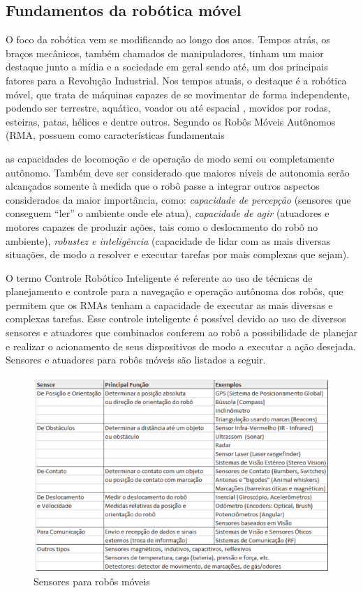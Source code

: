 \subsection{Fundamentos da robótica móvel}
O foco da robótica vem se modificando ao longo dos anos. Tempos atrás, os braços mecânicos, também chamados de manipuladores, tinham um maior destaque junto a mídia e a sociedade em geral \cite{wolf2009robotica} sendo até, um dos principais fatores para a Revolução Industrial. Nos tempos atuais, o destaque é a robótica móvel, que trata de máquinas capazes de se movimentar de forma independente, podendo ser terrestre, aquático, voador ou até espacial , movidos por rodas, esteiras, patas, hélices e dentre outros. 
Segundo \cite{wolf2009robotica} os Robôs Móveis Autônomos (RMA, possuem como características fundamentais
\begin{citacao}
as capacidades de locomoção e de operação de modo semi ou 
completamente autônomo. Também deve ser considerado que maiores níveis de 
autonomia serão alcançados somente à medida que o robô passe a integrar outros 
aspectos considerados da maior importância, como: \textit{capacidade de percepção} (sensores que conseguem “ler” o ambiente onde ele atua), \textit{capacidade de agir} (atuadores e motores capazes de produzir ações, tais como o deslocamento do robô no ambiente), \textit{robustez e inteligência} (capacidade de lidar com as mais diversas situações, de modo a resolver e executar tarefas por mais complexas que sejam). 
\end{citacao}
O termo Controle Robótico Inteligente é referente ao uso de técnicas de planejamento e controle para a navegação e operação autônoma dos robôs, que permitem que os RMAs tenham a capacidade de executar as mais diversas e complexas tarefas. Esse controle inteligente é possível devido ao uso de diversos sensores e atuadores que combinados conferem ao robô a possibilidade de planejar e realizar o acionamento de seus dispositivos de modo a executar a ação desejada. Sensores e atuadores para robôs móveis são listados a seguir.

\FloatBarrier
\begin{figure}[!h]
\centering
\includegraphics[keepaspectratio=true,scale=0.7]{figuras/sensoresRobosMoveis.png}
\caption{Sensores para robôs móveis \cite{wolf2009robotica}}
\label{modelagem}
\end{figure}
\clearpage 


